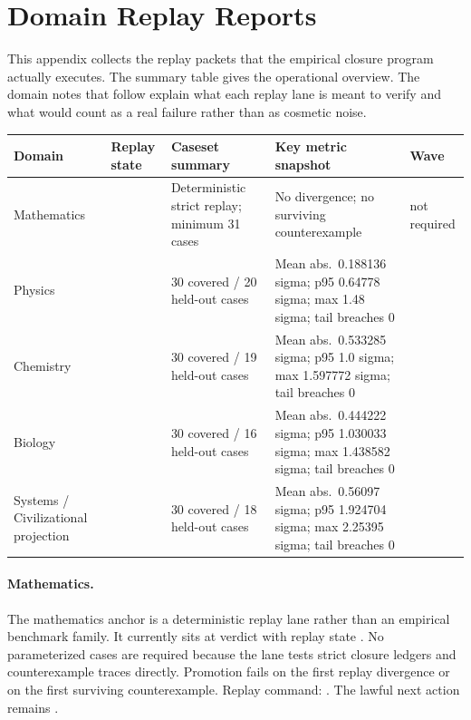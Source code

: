 \section{Domain Replay Reports}
\label{sec:oc-core-1-3-domain-replay-reports}

This appendix collects the replay packets that the empirical closure program
actually executes. The summary table gives the operational overview. The domain
notes that follow explain what each replay lane is meant to verify and what
would count as a real failure rather than as cosmetic noise.

\begingroup
\footnotesize
\RaggedRight
\setlength{\tabcolsep}{2pt}
\setlength{\LTleft}{0pt}
\setlength{\LTright}{0pt}

\begin{table}[htbp]
\centering
\begin{tabular}{@{}L{0.15\textwidth}L{0.13\textwidth}L{0.20\textwidth}L{0.27\textwidth}L{0.13\textwidth}@{}}
\toprule
Domain & Replay state & Caseset summary & Key metric snapshot & Wave \\
\midrule
Mathematics &  & Deterministic strict replay; minimum 31 cases & No divergence; no surviving counterexample & not required \\
Physics &  & 30 covered / 20 held-out cases & Mean abs.\ 0.188136 sigma; p95 0.64778 sigma; max 1.48 sigma; tail breaches 0 &  \\
Chemistry &  & 30 covered / 19 held-out cases & Mean abs.\ 0.533285 sigma; p95 1.0 sigma; max 1.597772 sigma; tail breaches 0 &  \\
Biology &  & 30 covered / 16 held-out cases & Mean abs.\ 0.444222 sigma; p95 1.030033 sigma; max 1.438582 sigma; tail breaches 0 &  \\
Systems / Civilizational projection &  & 30 covered / 18 held-out cases & Mean abs.\ 0.56097 sigma; p95 1.924704 sigma; max 2.25395 sigma; tail breaches 0 &  \\
\bottomrule
\end{tabular}
\end{table}

\paragraph{Mathematics.}
The mathematics anchor is a deterministic replay lane rather than an empirical
benchmark family. It currently sits at verdict  with replay state
. No parameterized cases are required because the lane
tests strict closure ledgers and counterexample traces directly. Promotion
fails on the first replay divergence or on the first surviving counterexample.
Replay command:
. The
lawful next action remains .


